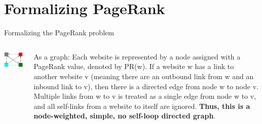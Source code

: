 \documentclass{beamer}
\begin{document}
\section{Formalizing PageRank}
\begin{frame}[t]{Formalizing the PageRank problem}
\begin{outline}
    \begin{columns}
        \begin{column}{0.5\textwidth}
            \includegraphics[width=\textwidth]{unweighted.png}
        \end{column}
        \begin{column}{0.5\textwidth}
            As a graph: Each website is represented by a node assigned with a PageRank value, denoted by PR(w). If a website w has a link to another website v (meaning there are an outbound link from w and an inbound link to v), then there is a directed edge from node w to node v. Multiple links from w to v is treated as a single edge from node w to v, and all self-links from a website to itself are ignored. \textbf{Thus, this is a node-weighted, simple, no self-loop directed graph}.
        \end{column}
    \end{columns}
\end{outline}
\end{frame}
\end{document}
